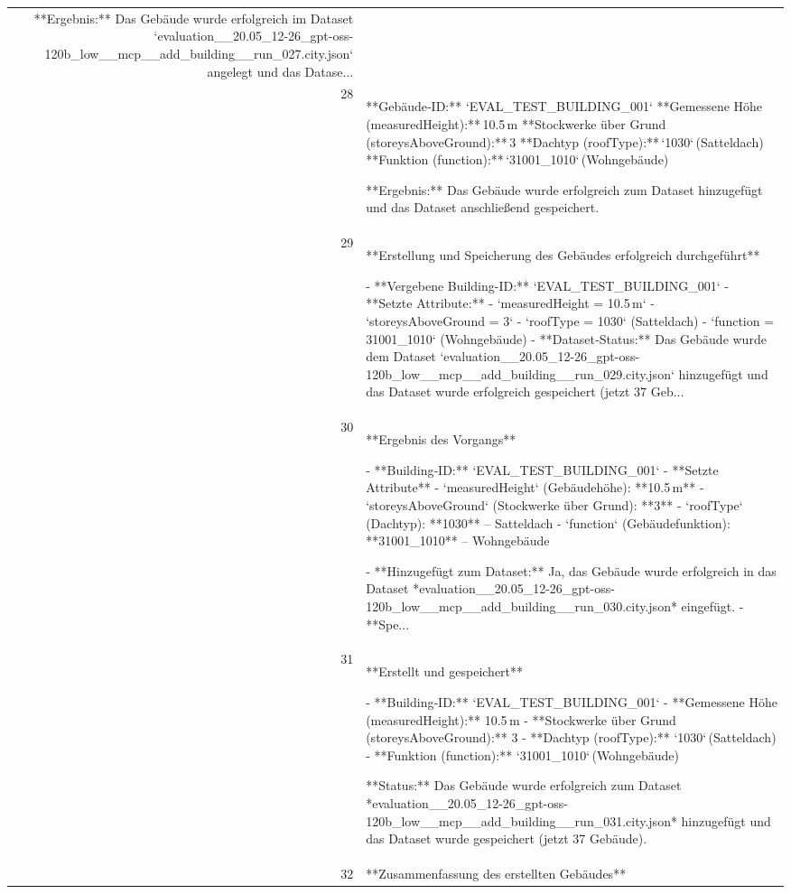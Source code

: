 \documentclass[a4paper,11pt]{article}
\begin{document}
\begin{table}[ht]
\begin{tabular}{r p{12cm}}
**Ergebnis:** Das Gebäude wurde erfolgreich im Dataset `evaluation\_\_20.05\_12-26\_gpt-oss-120b\_low\_\_mcp\_\_add\_building\_\_run\_027.city.json` angelegt und das Datase... \\
28 & **Gebäude‑ID:** `EVAL\_TEST\_BUILDING\_001`  
**Gemessene Höhe (measuredHeight):** 10.5 m  
**Stockwerke über Grund (storeysAboveGround):** 3  
**Dachtyp (roofType):** `1030` (Satteldach)  
**Funktion (function):** `31001\_1010` (Wohngebäude)  

**Ergebnis:** Das Gebäude wurde erfolgreich zum Dataset hinzugefügt und das Dataset anschließend gespeichert. \\
29 & **Erstellung und Speicherung des Gebäudes erfolgreich durchgeführt**

- **Vergebene Building-ID:** `EVAL\_TEST\_BUILDING\_001`  
- **Setzte Attribute:**  
  - `measuredHeight = 10.5 m`  
  - `storeysAboveGround = 3`  
  - `roofType = 1030` (Satteldach)  
  - `function = 31001\_1010` (Wohngebäude)  
- **Dataset‑Status:** Das Gebäude wurde dem Dataset `evaluation\_\_20.05\_12-26\_gpt-oss-120b\_low\_\_mcp\_\_add\_building\_\_run\_029.city.json` hinzugefügt und das Dataset wurde erfolgreich gespeichert (jetzt 37 Geb... \\
30 & **Ergebnis des Vorgangs**

- **Building‑ID:** `EVAL\_TEST\_BUILDING\_001`  
- **Setzte Attribute**
  - `measuredHeight` (Gebäudehöhe): **10.5 m**  
  - `storeysAboveGround` (Stockwerke über Grund): **3**  
  - `roofType` (Dachtyp): **1030** – Satteldach  
  - `function` (Gebäudefunktion): **31001\_1010** – Wohngebäude  

- **Hinzugefügt zum Dataset:** Ja, das Gebäude wurde erfolgreich in das Dataset *evaluation\_\_20.05\_12-26\_gpt-oss-120b\_low\_\_mcp\_\_add\_building\_\_run\_030.city.json* eingefügt.  
- **Spe... \\
31 & **Erstellt und gespeichert**  

- **Building‑ID:** `EVAL\_TEST\_BUILDING\_001`  
- **Gemessene Höhe (measuredHeight):** 10.5 m  
- **Stockwerke über Grund (storeysAboveGround):** 3  
- **Dachtyp (roofType):** `1030` (Satteldach)  
- **Funktion (function):** `31001\_1010` (Wohngebäude)  

**Status:** Das Gebäude wurde erfolgreich zum Dataset *evaluation\_\_20.05\_12-26\_gpt-oss-120b\_low\_\_mcp\_\_add\_building\_\_run\_031.city.json* hinzugefügt und das Dataset wurde gespeichert (jetzt 37 Gebäude). \\
32 & **Zusammenfassung des erstellten Gebäudes**


\end{tabular}
\end{table}
\end{document}
